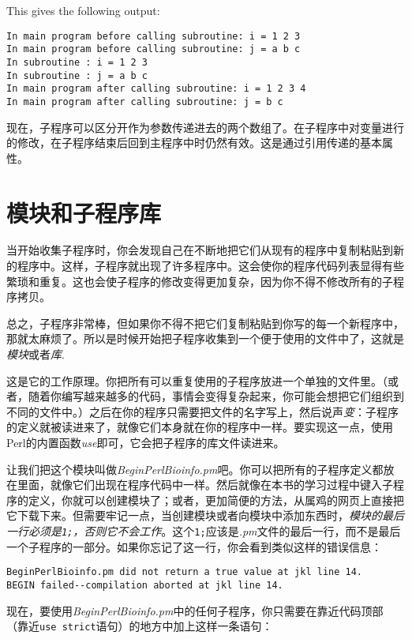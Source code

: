 This gives the following output:

\begin{lstlisting}
In main program before calling subroutine: i = 1 2 3
In main program before calling subroutine: j = a b c
In subroutine : i = 1 2 3
In subroutine : j = a b c
In main program after calling subroutine: i = 1 2 3 4
In main program after calling subroutine: j = b c
\end{lstlisting}

现在，子程序可以区分开作为参数传递进去的两个数组了。在子程序中对变量进行的修改，在子程序结束后回到主程序中时仍然有效。这是通过引用传递的基本属性。

\section{模块和子程序库}
当开始收集子程序时，你会发现自己在不断地把它们从现有的程序中复制粘贴到新的程序中。这样，子程序就出现了许多程序中。这会使你的程序代码列表显得有些繁琐和重复。这也会使子程序的修改变得更加复杂，因为你不得不修改所有的子程序拷贝。

总之，子程序非常棒，但如果你不得不把它们复制粘贴到你写的每一个新程序中，那就太麻烦了。所以是时候开始把子程序收集到一个便于使用的文件中了，这就是\textit{模块}或者\textit{库}.

这是它的工作原理。你把所有可以重复使用的子程序放进一个单独的文件里。（或者，随着你编写越来越多的代码，事情会变得复杂起来，你可能会想把它们组织到不同的文件中。）之后在你的程序只需要把文件的名字写上，然后说声\textit{变}：子程序的定义就被读进来了，就像它们本身就在你的程序中一样。要实现这一点，使用Perl的内置函数\textit{use}即可，它会把子程序的库文件读进来。

让我们把这个模块叫做\textit{BeginPerlBioinfo.pm}吧。你可以把所有的子程序定义都放在里面，就像它们出现在程序代码中一样。然后就像在本书的学习过程中键入子程序的定义，你就可以创建模块了；或者，更加简便的方法，从属鸡的网页上直接把它下载下来。但需要牢记一点，当创建模块或者向模块中添加东西时，\textit{模块的最后一行必须是\texttt{1;}，否则它不会工作}。这个\verb|1;|应该是\textit{.pm}文件的最后一行，而不是最后一个子程序的一部分。如果你忘记了这一行，你会看到类似这样的错误信息：

\begin{lstlisting}
BeginPerlBioinfo.pm did not return a true value at jkl line 14.
BEGIN failed--compilation aborted at jkl line 14.
\end{lstlisting}

现在，要使用\textit{BeginPerlBioinfo.pm}中的任何子程序，你只需要在靠近代码顶部（靠近\verb|use strict|语句）的地方中加上这样一条语句：

